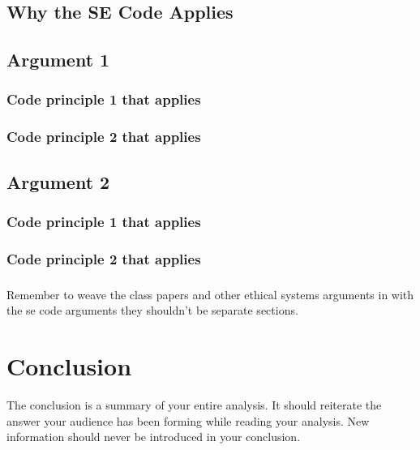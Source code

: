 \documentclass[11pt]{article}
\begin{document}
\subsection{Why the SE Code Applies}
\subsection{Argument 1}
\subsubsection{Code principle 1 that applies}
\subsubsection{Code principle 2 that applies}
\subsection{Argument 2}
\subsubsection{Code principle 1 that applies}
\subsubsection{Code principle 2 that applies}

\subsubsection*{}
Remember to weave the class papers and other ethical systems arguments in with the se code arguments they shouldn't be separate sections.

\section{Conclusion}
The conclusion is a summary of your entire analysis. It should reiterate the answer your audience has been forming while reading your analysis. New information should never be introduced in your conclusion. \cite{texTemp}

\nocite{*}




\end{document}
